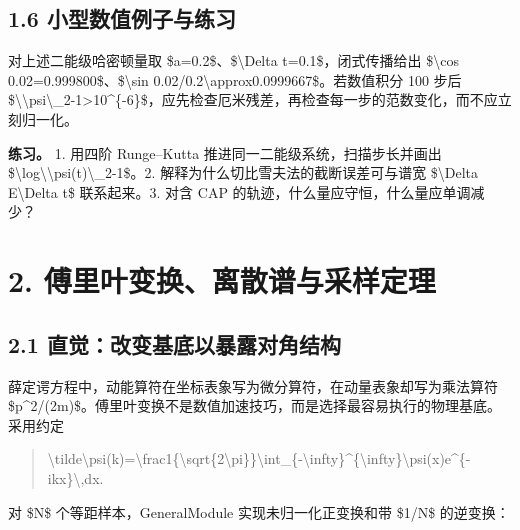\documentclass[UTF8,openany,11pt,fontset=fandol]{ctexbook}
\begin{document}
\subsection{\texorpdfstring{\textbf{1.6
小型数值例子与练习}}{1.6 小型数值例子与练习}}\label{ux5c0fux578bux6570ux503cux4f8bux5b50ux4e0eux7ec3ux4e60}

对上述二能级哈密顿量取 \$a=0.2\$、\$\textbackslash Delta
t=0.1\$，闭式传播给出 \$\textbackslash cos
0.02=0.999800\$、\$\textbackslash sin
0.02/0.2\textbackslash approx0.0999667\$。若数值积分 100 步后
\$\textbackslash\textbar\textbackslash psi\textbackslash\textbar\_2-1\textbar\textgreater10\^{}\{-6\}\$，应先检查厄米残差，再检查每一步的范数变化，而不应立刻归一化。

\textbf{练习。} 1. 用四阶 Runge--Kutta
推进同一二能级系统，扫描步长并画出
\$\textbackslash log\textbar\textbackslash\textbar\textbackslash psi(t)\textbackslash\textbar\_2-1\textbar\$。2.
解释为什么切比雪夫法的截断误差可与谱宽 \$\textbackslash Delta
E\textbackslash Delta t\$ 联系起来。3. 对含 CAP
的轨迹，什么量应守恒，什么量应单调减少？

\section{\texorpdfstring{\textbf{2.
傅里叶变换、离散谱与采样定理}}{2. 傅里叶变换、离散谱与采样定理}}\label{ux5085ux91ccux53f6ux53d8ux6362ux79bbux6563ux8c31ux4e0eux91c7ux6837ux5b9aux7406}

\subsection{\texorpdfstring{\textbf{2.1
直觉：改变基底以暴露对角结构}}{2.1 直觉：改变基底以暴露对角结构}}\label{ux76f4ux89c9ux6539ux53d8ux57faux5e95ux4ee5ux66b4ux9732ux5bf9ux89d2ux7ed3ux6784}

薛定谔方程中，动能算符在坐标表象写为微分算符，在动量表象却写为乘法算符
\$p\^{}2/(2m)\$。傅里叶变换不是数值加速技巧，而是选择最容易执行的物理基底。采用约定

\begin{quote}
\textbackslash tilde\textbackslash psi(k)=\textbackslash frac1\{\textbackslash sqrt\{2\textbackslash pi\}\}\textbackslash int\_\{-\textbackslash infty\}\^{}\{\textbackslash infty\}\textbackslash psi(x)e\^{}\{-ikx\}\textbackslash,dx.
\end{quote}

对 \$N\$ 个等距样本，GeneralModule 实现未归一化正变换和带 \$1/N\$
的逆变换：
\end{document}
